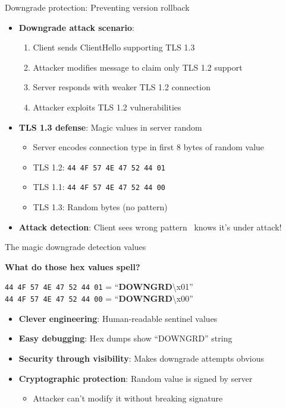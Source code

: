 \documentclass[aspectratio=169, lualatex, handout]{beamer}
\begin{document}
\begin{frame}{Downgrade protection: Preventing version rollback}
	\begin{itemize}
		\item \textbf{Downgrade attack scenario}:
		      \begin{enumerate}
			      \item Client sends ClientHello supporting TLS 1.3
			      \item Attacker modifies message to claim only TLS 1.2 support
			      \item Server responds with weaker TLS 1.2 connection
			      \item Attacker exploits TLS 1.2 vulnerabilities
		      \end{enumerate}
		\item \textbf{TLS 1.3 defense}: Magic values in server random
		      \begin{itemize}
			      \item Server encodes connection type in first 8 bytes of random value
			      \item TLS 1.2: \texttt{44 4F 57 4E 47 52 44 01}
			      \item TLS 1.1: \texttt{44 4F 57 4E 47 52 44 00}
			      \item TLS 1.3: Random bytes (no pattern)
		      \end{itemize}
		\item \textbf{Attack detection}: Client sees wrong pattern \rightarrow\ knows it's under attack!
	\end{itemize}
\end{frame}

\begin{frame}{The magic downgrade detection values}
	\begin{center}
		\textbf{What do those hex values spell?}
	\end{center}
	\pause
	\begin{center}
		\texttt{44 4F 57 4E 47 52 44 01} = ``\textbf{DOWNGRD}\textbackslash x01''\\
		\texttt{44 4F 57 4E 47 52 44 00} = ``\textbf{DOWNGRD}\textbackslash x00''
	\end{center}
	\pause
	\begin{itemize}
		\item \textbf{Clever engineering}: Human-readable sentinel values
		\item \textbf{Easy debugging}: Hex dumps show ``DOWNGRD'' string
		\item \textbf{Security through visibility}: Makes downgrade attempts obvious
		\item \textbf{Cryptographic protection}: Random value is signed by server
		      \begin{itemize}
			      \item Attacker can't modify it without breaking signature
		      \end{itemize}
	\end{itemize}
\end{frame}
\end{document}
